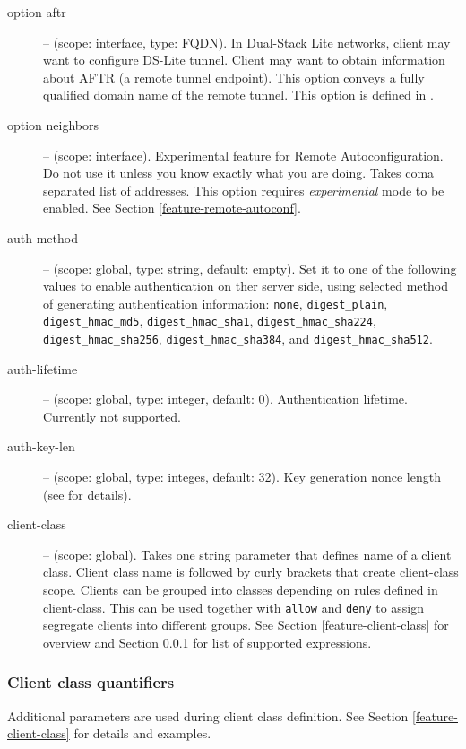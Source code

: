 \begin{description}
 \item[option aftr] -- (scope: interface, type: FQDN). In Dual-Stack Lite
   networks, client may want to configure DS-Lite tunnel. Client may
   want to obtain information about AFTR (a remote tunnel
   endpoint). This option conveys a fully qualified domain name of the
   remote tunnel. This option is defined in \cite{rfc6334}.

 \item[option neighbors] -- (scope: interface). Experimental feature
   for Remote Autoconfiguration. Do not use it unless you know exactly
   what you are doing. Takes coma separated list of addresses. This
   option requires \emph{experimental} mode to be enabled. See Section
   \ref{feature-remote-autoconf}.

 \item[auth-method] -- (scope: global, type: string, default:
   empty). Set it to one of the following values to enable
   authentication on ther server side, using selected method of
   generating authentication information:
   \texttt{none}, \texttt{digest\_plain}, \texttt{digest\_hmac\_md5},
   \texttt{digest\_hmac\_sha1}, \texttt{digest\_hmac\_sha224},
   \texttt{digest\_hmac\_sha256}, \texttt{digest\_hmac\_sha384},
   and \texttt{digest\_hmac\_sha512}.

 \item[auth-lifetime] -- (scope: global, type: integer, default:
   0). Authentication lifetime. Currently not supported.

 \item[auth-key-len] -- (scope: global, type: integes, default:
   32). Key generation nonce length (see \cite{draft-aaa} for
   details).

\item[client-class] -- (scope: global). Takes one string parameter
  that defines name of a client class. Client class name is followed
  by curly brackets that create client-class scope. Clients can be
  grouped into classes depending on rules defined in
  client-class. This can be used together with \verb+allow+ and
  \verb+deny+ to assign segregate clients into different groups. See
  Section \ref{feature-client-class} for overview and Section
  \ref{class-expressions} for list of supported expressions.

\end{description}

\subsubsection{Client class quantifiers}
\label{class-expressions}
Additional parameters are used during client class definition. See
Section \ref{feature-client-class} for details and examples.

